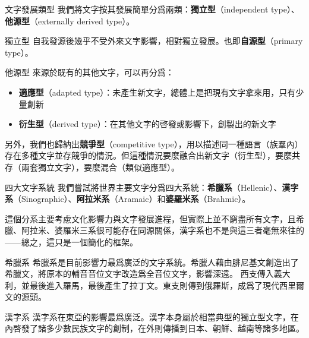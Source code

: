 \documentclass[aspectratio=169]{beamer}
\begin{document}
\begin{frame}{文字發展類型}
    我們將文字按其發展簡單分爲兩類：\textbf{獨立型}（independent type）、\textbf{他源型}（externally derived type）。

    \begin{block}{獨立型}
        自我發源後幾乎不受外來文字影響，相對獨立發展。也即\textbf{自源型}（primary type）。
    \end{block}

    \begin{block}{他源型}
        來源於既有的其他文字，可以再分爲：
        \begin{itemize}
            \item \textbf{適應型}（adapted type）：未產生新文字，總體上是把現有文字拿來用，只有少量創新
            \item \textbf{衍生型}（derived type）：在其他文字的啓發或影響下，創製出的新文字
        \end{itemize}
    \end{block}
    
    另外，我們也歸納出\textbf{競爭型}（competitive type），用以描述同一種語言（族羣內）存在多種文字並存競爭的情況。但這種情況要麼融合出新文字（衍生型），要麼共存（兩套獨立文字），要麼混合（類似適應型）。
\end{frame}

\begin{frame}{四大文字系統}
    我們嘗試將世界主要文字分爲四大系統：\textbf{希臘系}（Hellenic）、\textbf{漢字系}（Sinographic）、\textbf{阿拉米系}（Aramaic）和\textbf{婆羅米系}（Brahmic）。

    這個分系主要考慮文化影響力與文字發展進程，但實際上並不窮盡所有文字，且希臘、阿拉米、婆羅米三系很可能存在同源關係，漢字系也不是與這三者毫無來往的——總之，這只是一個簡化的框架。

    \begin{block}{希臘系}
        希臘系是目前影響力最爲廣泛的文字系統。希臘人藉由腓尼基文創造出了希臘文，將原本的輔音音位文字改造爲全音位文字，影響深遠。
        西支傳入義大利，並最後進入羅馬，最後產生了拉丁文。東支則傳到俄羅斯，成爲了現代西里爾文的源頭。
    \end{block}

    \begin{block}{漢字系}
        漢字系在東亞的影響最爲廣泛。漢字本身屬於相當典型的獨立型文字，在內啓發了諸多少數民族文字的創制，在外則傳播到日本、朝鮮、越南等諸多地區。
    \end{block}
\end{frame}
\end{document}
